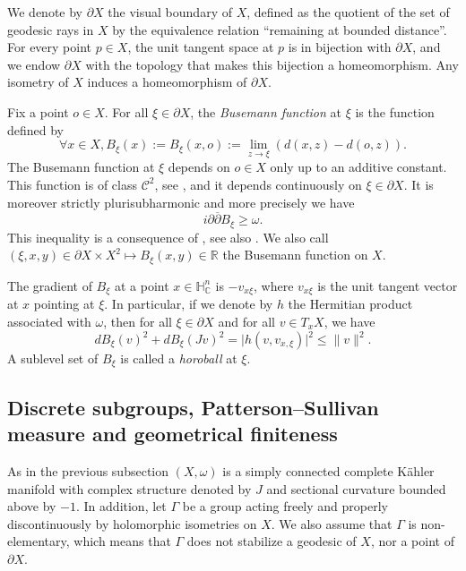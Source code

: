 \documentclass{article}
\theoremstyle{definition}
\theoremstyle{remark}
\newcommand{\C}{\mathbb{C}}
\newcommand{\R}{\mathbb{R}}
\newcommand{\HNC}{\mathbb{H}^{n}_{\C}}
\begin{document}
	We denote by $\partial X$ the visual boundary of $X$, defined as the quotient of the set of geodesic rays in $X$ by the equivalence relation ``remaining at bounded distance''. For every point $p\in X$, the unit tangent space at $p$ is in bijection with $\partial X$, and we endow $\partial X$ with the topology that makes this bijection a homeomorphism. Any isometry of $X$ induces a homeomorphism of $\partial X$.
	
	Fix a point $o\in X$. For all $\xi \in \partial X$, the \textit{Busemann function} at $\xi$ is the function defined by\begin{equation*}
		\forall x\in X, B_{\xi}(x) := B_{\xi}(x,o) := \lim_{z\to \xi}(d(x,z)-d(o,z)).
	\end{equation*}
	The Busemann function at $\xi$ depends on $o\in X$ only up to an additive constant. This function is of class $\mathcal{C}^{2}$, see \cite[Proposition 3.1]{heintzeGeometryHorospheres1977}, and it depends continuously on $\xi \in \partial X$. It is moreover strictly plurisubharmonic and more precisely we have\begin{equation}\label{eq-Busemann-spsh}
		i\partial\overline{\partial}B_{\xi} \ge \omega.
	\end{equation}
	This inequality is a consequence of \cite[Proposition 2.28]{greeneFunctionTheoryManifolds1979}, see also \cite{siuCompactificationNegativelyCurved1982,chenDiscreteGroupsHolomorphic2013}. We also call $(\xi,x,y)\in \partial X\times X^{2} \longmapsto B_{\xi}(x,y) \in\R$ the Busemann function on $X$.
	
	The gradient of $B_{\xi}$ at a point $x\in \HNC$ is $-v_{x\xi}$, where $v_{x\xi}$ is the unit tangent vector at $x$ pointing at $\xi$. In particular, if we denote by $h$ the Hermitian product associated with $\omega$, then for all $\xi\in \partial X$ and for all $v\in T_xX$, we have\begin{equation}\label{ineq-dBJ}
		dB_{\xi}(v)^{2} + dB_{\xi}(Jv)^{2} = \lvert h(v,v_{x,\xi})\rvert^{2}\le \lVert v\rVert^{2}.
	\end{equation}
A sublevel set of $B_{\xi}$ is called a \textit{horoball} at $\xi$.	
\subsection{Discrete subgroups, Patterson--Sullivan measure and geometrical finiteness}\label{sec:gen-geom-finite}
	
	As in the previous subsection $(X,\omega)$ is a simply connected complete Kähler manifold with complex structure denoted by $J$ and sectional curvature bounded above by $-1$. In addition, let $\Gamma$ be a group acting freely and properly discontinuously by holomorphic isometries on $X$. We also assume that $\Gamma$ is non-elementary, which means that $\Gamma$ does not stabilize a geodesic of $X$, nor a point of $\partial X$.\par
	
\end{document}
